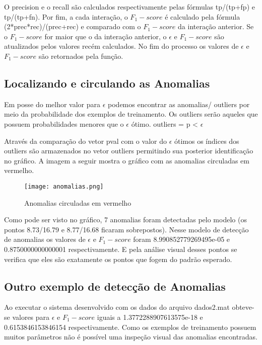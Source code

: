 \documentclass[12pt]{article}
\begin{document}
O precision e o recall são calculados respectivamente pelas fórmulas tp/(tp+fp) e tp/(tp+fn). Por fim, a cada interação, o $F_{1}-score$ é calculado pela fórmula (2*prec*rec)/(prec+rec) e comparado com o $F_{1}-score$ da interação anterior. Se o $F_{1}-score$ for maior que o da interação anterior, o $\epsilon$ e $F_{1}-score$ são atualizados pelos valores recém calculados. No fim do processo os valores de $\epsilon$ e $F_{1}-score$ são retornados pela função.

\subsection{Localizando e circulando as Anomalias} \label{lc_ano}

Em posse do melhor valor para $\epsilon$ podemos encontrar as anomalias/ outliers por meio da probabilidade dos exemplos de treinamento. Os outliers serão aqueles que possuem probabilidades menores que o $\epsilon$ ótimo. 
outliers = p < $\epsilon$

Através da comparação do vetor pval com o valor do $\epsilon$ ótimos os índices dos outliers são armazenados no vetor outliers permitindo sua posterior identificação no gráfico. A imagem a seguir mostra o gráfico com as anomalias circuladas em vermelho.

\begin{figure} [htp]
\begin{center}
\texttt{[image: anomalias.png]}
\caption{Anomalias circuladas em vermelho} \label{anomalias}
\end{center}
\end{figure}

Como pode ser visto no gráfico, 7 anomalias  foram detectadas pelo modelo (os pontos 8.73/16.79 e 8.77/16.68 ficaram sobrepostos). Nesse modelo de detecção de anomalias os valores de $\epsilon$ e $F_{1}-score$ foram 8.990852779269495e-05 e 0.8750000000000001 respectivamente. E pela análise visual desses pontos se verifica que eles são exatamente os pontos que fogem do padrão esperado. 

\subsection{Outro exemplo de detecção de Anomalias} \label{}

Ao executar o sistema desenvolvido com os dados do arquivo dados2.mat obteve-se valores para $\epsilon$ e $F_{1}-score$ iguais a 1.3772288907613575e-18 e 0.6153846153846154 respectivamente. Como os exemplos de treinamento possuem muitos parâmetros não é possível uma inspeção visual das anomalias encontradas. 
\end{document}
